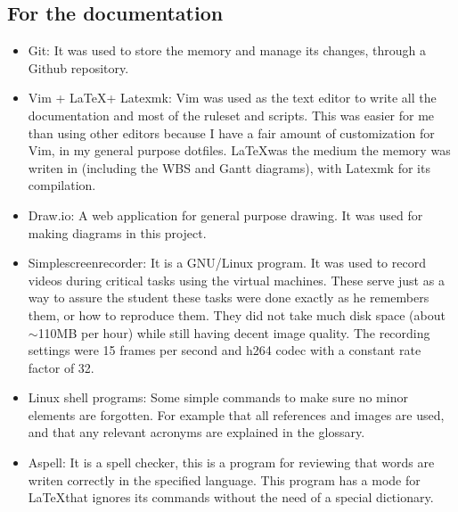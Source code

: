 \subsection{For the documentation}
\begin{itemize}
	\item Git: It was used to store the memory and manage its changes, through a Github repository\cite{memoria_github}.
	\item Vim + \LaTeX + Latexmk: Vim was used as the text editor to write all the documentation and most of the ruleset and scripts. This was easier for me than using other editors because I have a fair amount of customization for Vim, in my general purpose dotfiles\cite{andresgomezvidal_gitlab}. \LaTeX was the medium the memory was writen in (including the WBS and Gantt diagrams), with Latexmk for its compilation.
	\item Draw.io: A web application for general purpose drawing\cite{drawio}. It was used for making diagrams in this project.
	\item Simplescreenrecorder: It is a GNU/Linux program. It was used to record videos during critical tasks using the virtual machines. These serve just as a way to assure the student these tasks were done exactly as he remembers them, or how to reproduce them.
	They did not take much disk space (about $\sim$110MB per hour) while still having decent image quality. The recording settings were 15 frames per second and h264 codec with a constant rate factor of 32.
	\item Linux shell programs: Some simple commands to make sure no minor elements are forgotten. For example that all references and images are used, and that any relevant acronyms are explained in the glossary.
	\item Aspell: It is a spell checker\cite{aspell}, this is a program for reviewing that words are writen correctly in the specified language. This program has a mode for \LaTeX that ignores its commands without the need of a special dictionary.
\end{itemize}

